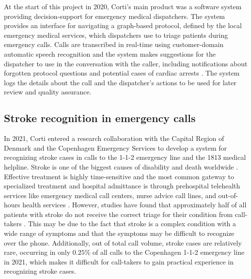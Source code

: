 At the start of this project in 2020, Corti's main product was a software system providing decision-support for emergency medical dispatchers.
The system 
provides an interface for navigating a graph-based protocol, defined by the local emergency medical services, which dispatchers use to triage patients during emergency calls. Calls are transcribed in real-time using customer-domain automatic speech recognition and the system makes suggestions for the dispatcher to use in the conversation with the caller, including notifications about forgotten protocol questions \cite{havtorn_multiqt_2020} and potential cases of cardiac arrests \cite{cite15, cite14}. The system logs the details about the call and the dispatcher's actions to be used for later review and quality assurance. 


\subsection{Stroke recognition in emergency calls}
In 2021, Corti entered a research collaboration with the Capital Region of Denmark and the Copenhagen Emergency Services to develop a system for recognizing stroke cases in calls to the 1-1-2 emergency line and the 1813 medical helpline. 
Stroke is one of the biggest causes of disability and death worldwide \cite{cite1,cite2,cite3}. Effective treatment is highly time-sensitive \cite{cite4,cite5} and the most common gateway to specialized treatment and hospital admittance is through prehospital telehealth services like emergency medical call centers, nurse advice call lines, and out-of-hours health services \cite{cite6,cite7}. However, studies have found that approximately half of all patients with stroke do not receive the correct triage for their condition from call-takers \cite{cite10,cite11,cite12}. This may be due to the fact that stroke is a complex condition with a wide range of symptoms and that the symptoms may be difficult to recognize over the phone. Additionally, out of total call volume, stroke cases are relatively rare, occurring in only $0.25\%$ of all calls to the Copenhagen 1-1-2 emergency line in 2021, which makes it difficult for call-takers to gain practical experience in recognizing stroke cases.

